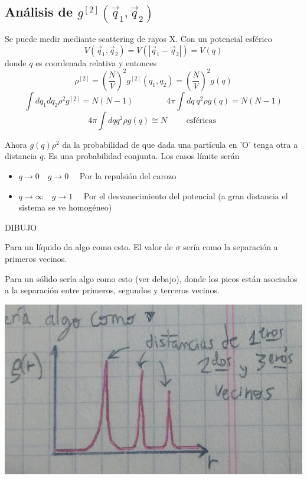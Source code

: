 \documentclass[10pt,oneside]{CBFT_book}
\begin{document}
\subsection{Análisis de $g^{[2]}(\vec{q}_1,\vec{q}_2)$}

Se puede medir mediante scattering de rayos X.
Con un potencial esférico
\[
	V(\vec{q}_1,\vec{q}_2) = V( |\vec{q}_1-\vec{q}_2| ) = V(q)
\]
donde $q$ es coordenada relativa  y entonces 
\[
	\rho^{[2]} = \left( \frac{N}{V} \right)^2 g^{[2]}( q_1, q_2 ) = 
	\left( \frac{N}{V} \right)^2 g( q )
\]
\[
	\int dq_1 dq_2 \rho^2 g^{[2]} = N(N-1) \qquad \qquad 4\pi \int dq \: q^2 \rho g(q) = N(N-1)
\]
\[
	4\pi \int dq q^2 \rho g(q) \cong N \qquad \text{ esféricas }
\]

Ahora $g(q)\rho^2$ da la probabilidad de que dada una partícula en 'O' tenga otra a distancia $q$. Es una probabilidad
conjunta.
Los casos límite serán 
\begin{itemize}
	\item $q \to 0 \quad g \to 0 \quad $ Por la repulsión del carozo
	\item $q \to \infty \quad g \to 1  \quad $ Por el desvanecimiento del potencial (a gran distancia el sistema se 
ve 	homogéneo)
\end{itemize}

DIBUJO

Para un líquido da algo como esto. El valor de $ \sigma $ sería como la separación a primeros vecinos.

Para un sólido sería algo como esto (ver debajo), donde los picos están asociados a la separación entre primeros, segundos y
terceros vecinos.

\includegraphics[scale=0.3]{images/1625623567.jpg}
\end{document}
